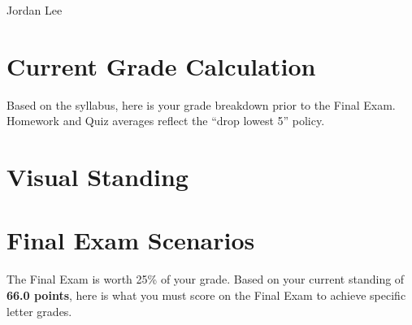 \documentclass{report-card}
\begin{document}
\begin{reportcard}{Jordan Lee}

	\section*{Current Grade Calculation}

	Based on the syllabus, here is your grade breakdown prior to the
	Final Exam. Homework and Quiz averages reflect the ``drop lowest 5''
	policy.


	\section*{Visual Standing}


	\section*{Final Exam Scenarios}

	The Final Exam is worth 25\% of your grade. Based on your current
	standing of \textbf{66.0 points}, here is what you must score on the
	Final Exam to achieve specific letter grades.



\end{reportcard}
\end{document}

